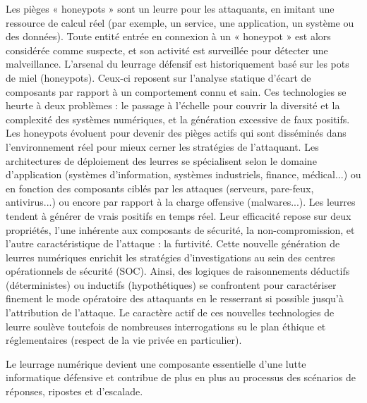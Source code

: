 Les pièges « honeypots » sont un leurre pour les attaquants, en imitant une ressource de calcul réel (par exemple, un service, une application, un système ou des données). Toute entité entrée en connexion à un « honeypot » est alors considérée comme suspecte, et son activité est surveillée pour détecter une malveillance.
L'arsenal du leurrage défensif est historiquement basé sur les pots de miel (honeypots). Ceux-ci reposent sur l'analyse statique d'écart de composants par rapport à un comportement connu et sain. Ces technologies se heurte à deux problèmes : le passage à l'échelle pour couvrir la diversité et la complexité des systèmes numériques, et la génération excessive de faux positifs. Les honeypots évoluent pour devenir des pièges actifs qui sont disséminés dans l'environnement réel pour mieux cerner les stratégies de l'attaquant. Les architectures de déploiement des leurres se spécialisent selon le domaine d'application (systèmes d'information, systèmes industriels, finance, médical...) ou en fonction des composants ciblés par les attaques (serveurs, pare-feux, antivirus...) ou encore par rapport à la charge offensive (malwares...). Les leurres tendent à générer de vrais positifs en temps réel. Leur efficacité repose sur deux propriétés, l'une inhérente aux composants de sécurité, la non-compromission, et l'autre caractéristique de l'attaque : la furtivité.  
Cette nouvelle génération de leurres numériques enrichit les stratégies d'investigations au sein des centres opérationnels de sécurité (SOC).  Ainsi, des logiques de raisonnements déductifs (déterministes) ou inductifs (hypothétiques) se confrontent pour caractériser finement le mode opératoire des attaquants en le resserrant si possible jusqu'à l'attribution de l'attaque. 
Le caractère actif de ces nouvelles technologies de leurre soulève toutefois de nombreuses  interrogations su le plan éthique et  réglementaires (respect de la vie privée en particulier).

Le leurrage numérique devient une composante essentielle d'une lutte informatique défensive et contribue de plus en plus au processus des scénarios de réponses, ripostes et d'escalade.

